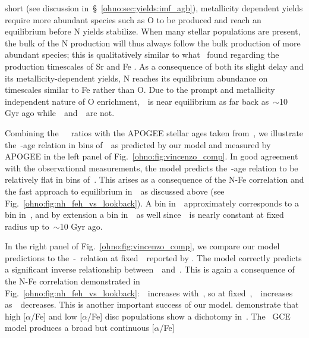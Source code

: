 short (see discussion in~\S~\ref{ohno:sec:yields:imf_agb}), metallicity dependent
yields require more abundant species such as O to be produced and reach an
equilibrium before N yields stabilize.
When many stellar populations are present, the bulk of the N production will
thus always follow the bulk production of more abundant species; this is 
qualitatively similar to what~\citet{Johnson2020} found regarding the
production timescales of Sr and Fe
\citep[see also][]{Tinsley1979}.
As a consequence of both its slight delay and its metallicity-dependent
yields, N reaches its equilibrium abundance on timescales similar to Fe rather
than O.
Due to the prompt and metallicity independent nature of O enrichment,~\oh~is
near equilibrium as far back as~$\sim$10 Gyr ago while~\nh~and~\feh~are not.
\par
Combining the~\citet{Vincenzo2021b}~\no~ratios with the APOGEE stellar ages
taken from~\citet{Miglio2021}, we illustrate the~\no-age relation in bins
of~\feh~as predicted by our model and measured by APOGEE in the left panel of
Fig.~\ref{ohno:fig:vincenzo_comp}.
In good agreement with the observational measurements, the model predicts
the~\no-age relation to be relatively flat in bins of~\feh.
This arises as a consequence of the N-Fe correlation and the fast approach to
equilibrium in~\oh~as discussed above (see Fig.~\ref{ohno:fig:nh_feh_vs_lookback}).
A bin in~\feh~approximately corresponds to a bin in~\nh, and by extension a bin
in~\no~as well since~\oh~is nearly constant at fixed radius up to~$\sim$10 Gyr
ago.
\par
In the right panel of Fig.~\ref{ohno:fig:vincenzo_comp}, we compare our model
predictions to the~\no-\ofe~relation at fixed~\oh~reported by
\citet{Vincenzo2021b}.
The model correctly predicts a significant inverse relationship
between~\no~and~\ofe.
This is again a consequence of the N-Fe correlation demonstrated in
Fig.~\ref{ohno:fig:nh_feh_vs_lookback}:~\nh~increases with~\feh, so at
fixed~\oh,~\no~increases as~\ofe~decreases.
This is another important success of our model.
\citet{Vincenzo2021b} demonstrate that high [$\alpha$/Fe] and low [$\alpha$/Fe]
disc populations show a dichotomy in~\no.
The~\citet{Johnson2021} GCE model produces a broad but continuous [$\alpha$/Fe]
